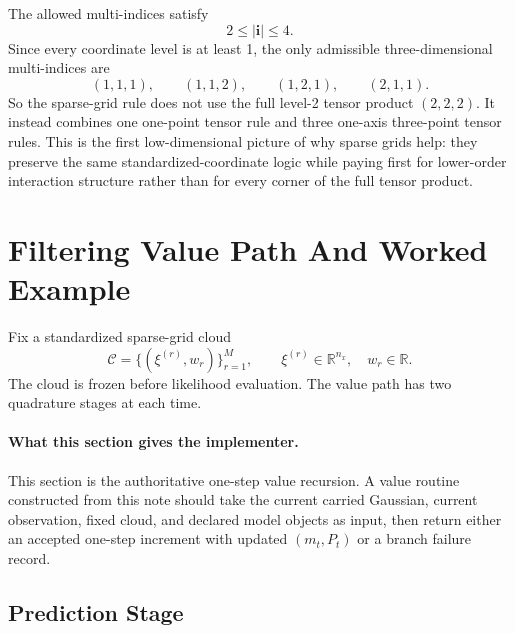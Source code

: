 \documentclass[11pt]{article}
\numberwithin{equation}{section}
\newcommand{\R}{\mathbb R}
\begin{document}
The allowed multi-indices satisfy
\begin{equation}
  2\le |\mathbf i| \le 4.
  \label{eq:p37-3d-band}
\end{equation}
Since every coordinate level is at least 1, the only admissible three-dimensional
multi-indices are
\begin{equation}
  (1,1,1),
  \qquad
  (1,1,2),
  \qquad
  (1,2,1),
  \qquad
  (2,1,1).
  \label{eq:p37-3d-active-indices}
\end{equation}
So the sparse-grid rule does not use the full level-2 tensor product
\((2,2,2)\).  It instead combines one one-point tensor rule and three
one-axis three-point tensor rules.  This is the first low-dimensional picture of
why sparse grids help: they preserve the same standardized-coordinate logic while
paying first for lower-order interaction structure rather than for every corner
of the full tensor product.

\section{Filtering Value Path And Worked Example}
\label{sec:p31-value-path}

Fix a standardized sparse-grid cloud
\begin{equation}
  \mathcal C=\{(\xi^{(r)},w_r)\}_{r=1}^M,
  \qquad
  \xi^{(r)}\in\R^{n_x},
  \quad
  w_r\in\R.
  \label{eq:p31-cloud-for-filter}
\end{equation}
The cloud is frozen before likelihood evaluation.  The value path has two
quadrature stages at each time.

\paragraph{What this section gives the implementer.}
This section is the authoritative one-step value recursion.  A value routine
constructed from this note should take the current carried Gaussian,
current observation, fixed cloud, and declared model objects as input, then
return either an accepted one-step increment with updated \((m_t,P_t)\) or a
branch failure record.

\subsection{Prediction Stage}
\end{document}
